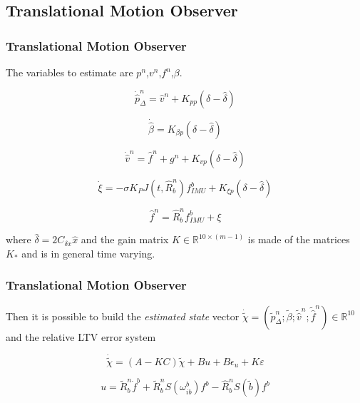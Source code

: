 \documentclass{beamer}
\begin{document}
    \subsection{Translational Motion Observer}
	\begin{frame}
		\frametitle{Translational Motion Observer}
		The variables to estimate are $p^n$,$v^n$,$f^n$,$\beta$.
		
		\[ \dot{\hat{p}}^n_\Delta = \hat{v}^n + K_{pp}(\delta - \hat{\delta})  \]
		
		\[ \dot{\hat{\beta}} = K_{\beta p} (\delta - \hat{\delta}) \]
		
		\[ \dot{\hat{v}}^n = \hat{f}^n + g^n + K_{vp}(\delta - \hat{\delta})\]
		
		\[ \dot{\xi} = - \sigma K_P J(t, \hat{R}^n_b)f^b_{IMU} + K_{\xi p}(\delta - \hat{\delta}) \]
		
		\[ \hat{f}^n = \hat{R}^n_b f^b_{IMU} + \xi  \]
		
		where $\hat{\delta} = 2C_{\delta x}\hat{x}$ and the gain matrix $K \in \mathds{R}^{10\times(m-1)}$ is made of the matrices $K_*$ and is in general time varying.
	\end{frame}
    \begin{frame}
		\frametitle{Translational Motion Observer}
		Then it is possible to build the \textit{estimated state} vector $\dot{\tilde{\chi}} = (\tilde{p}^n_\Delta;\tilde{\beta}; \tilde{\hat{v}}^n; \tilde{\hat{f}}^n) \in \mathds{R}^{10}$ and the relative LTV error system
		
		\[ \dot{\tilde{\chi}} = (A - KC)\tilde{\chi} + Bu + B\epsilon_u + K\varepsilon\]
		
		\[ u = \tilde{R}^n_b \dot{f}^b + \tilde{R}^n_b S(\omega^b_{ib})f^b - \hat{R}^n_b S(\tilde{b})f^b\]
	\end{frame}
\end{document}
